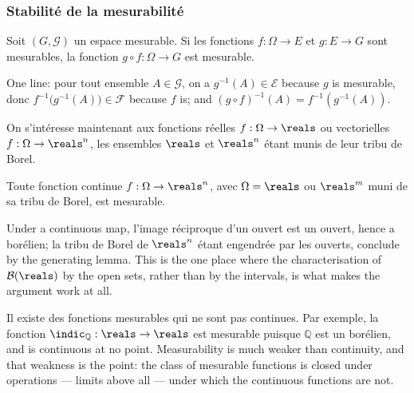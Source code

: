 \subsubsection{Stabilité de la mesurabilité}

\begin{prop}
  Soit $(G,\mathcal{G})$ un espace mesurable. Si les fonctions $f : \Omega \to E$ et
  $g : E \to G$ sont mesurables, la fonction $g \circ f : \Omega \to G$ est
  mesurable.
\end{prop}

\begin{remark}
  One line: pour tout ensemble $A \in \mathcal{G}$, on a $g^{-1}(A) \in \mathcal{E}$
  because $g$ is mesurable, donc $f^{-1}\bigl(g^{-1}(A)\bigr) \in \mathcal{F}$ because
  $f$ is; and $(g \circ f)^{-1}(A) = f^{-1}(g^{-1}(A))$.
\end{remark}

On s'intéresse maintenant aux fonctions réelles $f : \Omega \to \reals$ ou
vectorielles $f : \Omega \to \reals^{n}$, les ensembles $\reals$ et $\reals^{n}$
étant munis de leur tribu de Borel.

\begin{prop}
  Toute fonction continue $f : \Omega \to \reals^{n}$, avec $\Omega = \reals$ ou
  $\reals^{m}$ muni de sa tribu de Borel, est mesurable.
\end{prop}

\begin{remark}
  Under a continuous map, l'image réciproque d'un ouvert est un ouvert, hence a
  borélien; la tribu de Borel de $\reals^{n}$ étant engendrée par les ouverts,
  conclude by the generating lemma. This is the one place where the characterisation
  of $\mathcal{B}(\reals)$ by the open sets, rather than by the intervals, is what
  makes the argument work at all.
\end{remark}

\begin{remark}
  Il existe des fonctions mesurables qui ne sont pas continues. Par exemple, la
  fonction $\indic_{\mathbb{Q}} : \reals \to \reals$ est mesurable puisque
  $\mathbb{Q}$ est un borélien, and is continuous at no point. Measurability is much
  weaker than continuity, and that weakness is the point: the class of mesurable
  functions is closed under operations --- limits above all --- under which the
  continuous functions are not.
\end{remark}


